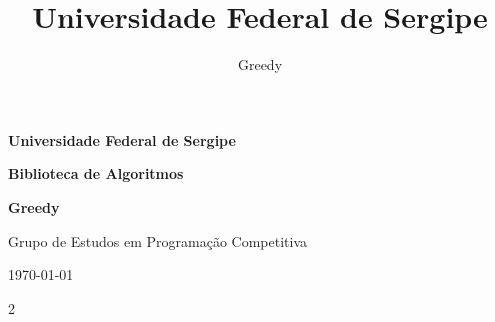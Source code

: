 \documentclass[10pt]{article}
\title{\vspace{-4ex}\Large{Universidade Federal de Sergipe}}
\author{Greedy}
\date{}
\begin{document}
\begin{landscape}

\begin{titlepage}
    \centering
    \vspace*{5cm}
    {\Huge\bfseries Universidade Federal de Sergipe \par}
    \vspace{2cm}
    {\Huge\bfseries Biblioteca de Algoritmos \par}
    \vspace{1cm}
    {\Large\bfseries Greedy \par}
    {\Large Grupo de Estudos em Programação Competitiva \par}
    \vfill
    {\large \today \par}
\end{titlepage}

\begin{multicols}{2}

\setcounter{tocdepth}{2}
\tableofcontents
\pagestyle{fancy}



\end{multicols}
\end{landscape}
\end{document}

